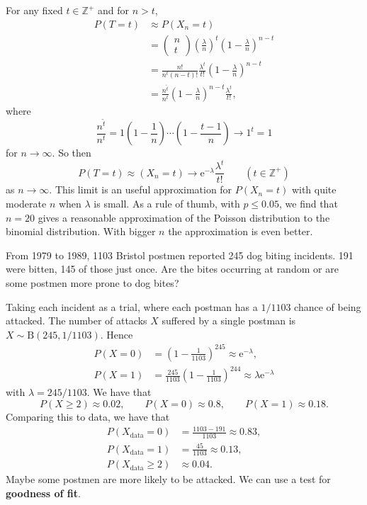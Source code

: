 \documentclass[letter-paper]{tufte-book}
\newenvironment{example}[1][Example]{\begin{trivlist}
\item[\hskip \labelsep {\bfseries #1}]}{\end{trivlist}}
\newcommand{\ex}{\mathrm{e}}
\newcommand\Def[1]{\textbf{#1}}
\begin{document}
For any fixed $t\in\mathbb{Z}^+$ and for $n>t$,
\begin{align*}
  P(T=t) &\approx P(X_n = t) \\
  &= \begin{pmatrix} n\\ t\end{pmatrix} \left(\frac{\lambda}{n}\right)^t
  \left(1-\frac{\lambda}{n}\right)^{n-t} \\
  &= \frac{n!}{n^t (n-t)!}\frac{\lambda^t}{t!}
  \left(1-\frac{\lambda}{n}\right)^{n-t} \\
  &= \frac{n^{\tilde{t}}}{n^t}\left(1-\frac{\lambda}{n}\right)^{n-t}
  \frac{\lambda^t}{t!},
\end{align*}
where
\begin{equation*}
  \frac{n^{\tilde{t}}}{n^t} = 1\left(1-\frac{1}{n}\right)\cdots
  \left(1-\frac{t-1}{n}\right)\to 1^t=1
\end{equation*}
for $n\to\infty$. So then
\begin{equation*}
  P(T=t)\approx(X_n = t)\to\ex^{-\lambda}\frac{\lambda^t}{t!}
  \qquad(t\in\mathbb{Z}^+)
\end{equation*}
as $n\to\infty$. This limit is an useful approximation for $P(X_n = t)$ with
quite moderate $n$ when $\lambda$ is small. As a rule of thumb, with $p\leq
0.05$, we find that $n=20$ gives a reasonable approximation of the Poisson
distribution to the binomial distribution. With bigger $n$ the approximation is
even better.
\begin{example}
  From 1979 to 1989, 1103 Bristol postmen reported 245 dog biting incidents. 191
  were bitten, 145 of those just once. Are the bites occurring at random or are
  some postmen more prone to dog bites?
  
  Taking each incident as a trial, where each postman has a $1/1103$ chance of
  being attacked. The number of attacks $X$ suffered by a single postman is
  $X\sim\mbox{B}(245,1/1103)$. Hence
  \begin{align*}
    P(X=0) &= \left(1-\frac{1}{1103}\right)^{245}\approx\ex^{-\lambda}, \\
    P(X=1) &= \frac{245}{1103}\left(1-\frac{1}{1103}\right)^{244}\approx
    \lambda\ex^{-\lambda}
  \end{align*}
  with $\lambda=245/1103$. We have that
  \begin{equation*}
    P(X\geq2)\approx0.02,\qquad P(X=0)\approx0.8, \qquad P(X=1)\approx0.18.
  \end{equation*}
  Comparing this to data, we have that
  \begin{align*}
    P(X_{\mbox{data}} = 0) &= \frac{1103-191}{1103} \approx0.83, \\
    P(X_{\mbox{data}} = 1) &= \frac{45}{1103} \approx0.13, \\
    P(X_{\mbox{data}} \geq 2) &\approx 0.04.
  \end{align*}
  Maybe some postmen are more likely to be attacked. We can use a test for
  \Def{goodness of fit}.
\end{example}
\end{document}
